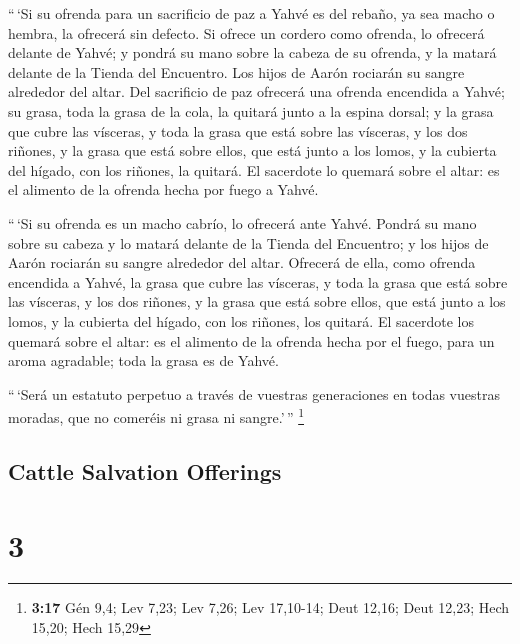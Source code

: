 \begin{paracol}{2}
 ``\,`Si su ofrenda para un sacrificio de paz a Yahvé es
del rebaño, ya sea macho o hembra, la ofrecerá sin defecto.
 Si ofrece un cordero como ofrenda, lo ofrecerá delante de
Yahvé;  y pondrá su mano sobre la cabeza de su ofrenda, y
la matará delante de la Tienda del Encuentro. Los hijos de Aarón
rociarán su sangre alrededor del altar.  Del sacrificio de
paz ofrecerá una ofrenda encendida a Yahvé; su grasa, toda la grasa de
la cola, la quitará junto a la espina dorsal; y la grasa que cubre las
vísceras, y toda la grasa que está sobre las vísceras,  y
los dos riñones, y la grasa que está sobre ellos, que está junto a los
lomos, y la cubierta del hígado, con los riñones, la quitará.
 El sacerdote lo quemará sobre el altar: es el alimento
de la ofrenda hecha por fuego a Yahvé.

 ``\,`Si su ofrenda es un macho cabrío, lo ofrecerá ante
Yahvé.  Pondrá su mano sobre su cabeza y lo matará
delante de la Tienda del Encuentro; y los hijos de Aarón rociarán su
sangre alrededor del altar.  Ofrecerá de ella, como
ofrenda encendida a Yahvé, la grasa que cubre las vísceras, y toda la
grasa que está sobre las vísceras,  y los dos riñones, y
la grasa que está sobre ellos, que está junto a los lomos, y la cubierta
del hígado, con los riñones, los quitará.  El sacerdote
los quemará sobre el altar: es el alimento de la ofrenda hecha por el
fuego, para un aroma agradable; toda la grasa es de Yahvé.

 ``\,`Será un estatuto perpetuo a través de vuestras
generaciones en todas vuestras moradas, que no comeréis ni grasa ni
sangre.'\,'' \footnote{\textbf{3:17} Gén 9,4; Lev 7,23; Lev 7,26; Lev
  17,10-14; Deut 12,16; Deut 12,23; Hech 15,20; Hech 15,29}

\switchcolumn
\begin{otherlanguage}{english}

\hypertarget{cattle-salvation-offerings}{%
\subsection{Cattle Salvation
Offerings}\label{cattle-salvation-offerings}}

\hypertarget{section-5}{%
\section{3}\label{section-5}}


\end{otherlanguage}
\end{paracol}
